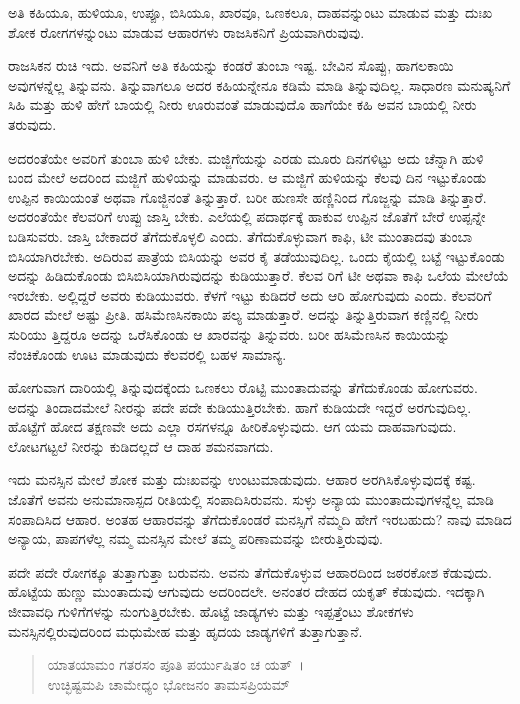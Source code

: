 {\small ಅತಿ ಕಹಿಯೂ, ಹುಳಿಯೂ, ಉಪ್ಪೂ, ಬಿಸಿಯೂ, ಖಾರವೂ, ಒಣಕಲೂ, ದಾಹವನ್ನುಂಟು ಮಾಡುವ ಮತ್ತು ದುಃಖ ಶೋಕ ರೋಗಗಳನ್ನುಂಟು ಮಾಡುವ ಆಹಾರಗಳು ರಾಜಸಿಕನಿಗೆ ಪ್ರಿಯವಾಗಿರುವುವು.}

ರಾಜಸಿಕನ ರುಚಿ ಇದು. ಅವನಿಗೆ ಅತಿ ಕಹಿಯನ್ನು ಕಂಡರೆ ತುಂಬಾ ಇಷ್ಟ. ಬೇವಿನ ಸೊಪ್ಪು, ಹಾಗಲಕಾಯಿ ಅವುಗಳನ್ನೆಲ್ಲ ತಿನ್ನುವನು. ತಿನ್ನುವಾಗಲೂ ಅದರ ಕಹಿಯನ್ನೇನೂ ಕಡಿಮೆ ಮಾಡಿ ತಿನ್ನುವುದಿಲ್ಲ. ಸಾಧಾರಣ ಮನುಷ್ಯನಿಗೆ ಸಿಹಿ ಮತ್ತು ಹುಳಿ ಹೇಗೆ ಬಾಯಲ್ಲಿ ನೀರು ಊರುವಂತೆ ಮಾಡುವುದೊ ಹಾಗೆಯೇ ಕಹಿ ಅವನ ಬಾಯಲ್ಲಿ ನೀರು ತರುವುದು.

ಅದರಂತೆಯೇ ಅವರಿಗೆ ತುಂಬಾ ಹುಳಿ ಬೇಕು. ಮಜ್ಜಿಗೆಯನ್ನು ಎರಡು ಮೂರು ದಿನಗಳಿಟ್ಟು ಅದು ಚೆನ್ನಾಗಿ ಹುಳಿ ಬಂದ ಮೇಲೆ ಅದರಿಂದ ಮಜ್ಜಿಗೆ ಹುಳಿಯನ್ನು ಮಾಡುವರು. ಆ ಮಜ್ಜಿಗೆ ಹುಳಿಯನ್ನು ಕೆಲವು ದಿನ ಇಟ್ಟುಕೊಂಡು ಉಪ್ಪಿನ ಕಾಯಿಯಂತೆ ಅಥವಾ ಗೊಜ್ಜಿನಂತೆ ತಿನ್ನುತ್ತಾರೆ. ಬರೀ ಹುಣಸೇ ಹಣ್ಣಿನಿಂದ ಗೊಜ್ಜನ್ನು ಮಾಡಿ ತಿನ್ನುತ್ತಾರೆ. ಅದರಂತೆಯೇ ಕೆಲವರಿಗೆ ಉಪ್ಪು ಜಾಸ್ತಿ ಬೇಕು. ಎಲೆಯಲ್ಲಿ ಪದಾರ್ಥಕ್ಕೆ ಹಾಕುವ ಉಪ್ಪಿನ ಜೊತೆಗೆ ಬೇರೆ ಉಪ್ಪನ್ನೇ ಬಡಿಸುವರು. ಜಾಸ್ತಿ ಬೇಕಾದರೆ ತೆಗೆದುಕೊಳ್ಳಲಿ ಎಂದು. ತೆಗೆದುಕೊಳ್ಳುವಾಗ ಕಾಫಿ, ಟೀ ಮುಂತಾದವು ತುಂಬಾ ಬಿಸಿಯಾಗಿರಬೇಕು. ಅದಿರುವ ಪಾತ್ರೆಯ ಬಿಸಿಯನ್ನು ಅವರ ಕೈ ತಡೆಯುವುದಿಲ್ಲ. ಒಂದು ಕೈಯಲ್ಲಿ ಬಟ್ಟೆ ಇಟ್ಟುಕೊಂಡು ಅದನ್ನು ಹಿಡಿದುಕೊಂಡು ಬಿಸಿಬಿಸಿಯಾಗಿರುವುದನ್ನು ಕುಡಿಯುತ್ತಾರೆ. ಕೆಲವ ರಿಗೆ ಟೀ ಅಥವಾ ಕಾಫಿ ಒಲೆಯ ಮೇಲೆಯೆ ಇರಬೇಕು. ಅಲ್ಲಿದ್ದರೆ ಅವರು ಕುಡಿಯುವರು. ಕೆಳಗೆ ಇಟ್ಟು ಕುಡಿದರೆ ಅದು ಆರಿ ಹೋಗುವುದು ಎಂದು. ಕೆಲವರಿಗೆ ಖಾರದ ಮೇಲೆ ಅಷ್ಟು ಪ್ರೀತಿ. ಹಸಿಮೆಣಸಿನಕಾಯಿ ಪಲ್ಯ ಮಾಡುತ್ತಾರೆ. ಅದನ್ನು ತಿನ್ನುತ್ತಿರುವಾಗ ಕಣ್ಣಿನಲ್ಲಿ ನೀರು ಸುರಿಯು ತ್ತಿದ್ದರೂ ಅದನ್ನು ಒರೆಸಿಕೊಂಡು ಆ ಖಾರವನ್ನು ತಿನ್ನುವರು. ಬರೀ ಹಸಿಮೆಣಸಿನ ಕಾಯಿಯನ್ನು ನೆಂಚಿಕೊಂಡು ಊಟ ಮಾಡುವುದು ಕೆಲವರಲ್ಲಿ ಬಹಳ ಸಾಮಾನ್ಯ.

ಹೋಗುವಾಗ ದಾರಿಯಲ್ಲಿ ತಿನ್ನುವುದಕ್ಕೆಂದು ಒಣಕಲು ರೊಟ್ಟಿ ಮುಂತಾದುವನ್ನು ತೆಗೆದುಕೊಂಡು ಹೋಗುವರು. ಅದನ್ನು ತಿಂದಾದಮೇಲೆ ನೀರನ್ನು ಪದೇ ಪದೇ ಕುಡಿಯುತ್ತಿರಬೇಕು. ಹಾಗೆ ಕುಡಿಯದೇ ಇದ್ದರೆ ಅರಗುವುದಿಲ್ಲ. ಹೊಟ್ಟೆಗೆ ಹೋದ ತಕ್ಷಣವೇ ಅದು ಎಲ್ಲಾ ರಸಗಳನ್ನೂ ಹೀರಿಕೊಳ್ಳುವುದು. ಆಗ ಯಮ ದಾಹವಾಗುವುದು. ಲೋಟಗಟ್ಟಲೆ ನೀರನ್ನು ಕುಡಿದಲ್ಲದೆ ಆ ದಾಹ ಶಮನವಾಗದು.

ಇದು ಮನಸ್ಸಿನ ಮೇಲೆ ಶೋಕ ಮತ್ತು ದುಃಖವನ್ನು ಉಂಟುಮಾಡುವುದು. ಆಹಾರ ಅರಗಿಸಿಕೊಳ್ಳುವುದಕ್ಕೆ ಕಷ್ಟ. ಜೊತೆಗೆ ಅವನು ಅನುಮಾನಾಸ್ಪದ ರೀತಿಯಲ್ಲಿ ಸಂಪಾದಿಸಿರುವನು. ಸುಳ್ಳು ಅನ್ಯಾಯ ಮುಂತಾದುವುಗಳನ್ನೆಲ್ಲ ಮಾಡಿ ಸಂಪಾದಿಸಿದ ಆಹಾರ. ಅಂತಹ ಆಹಾರವನ್ನು ತೆಗೆದುಕೊಂಡರೆ ಮನಸ್ಸಿಗೆ ನೆಮ್ಮದಿ ಹೇಗೆ ಇರಬಹುದು? ನಾವು ಮಾಡಿದ ಅನ್ಯಾಯ, ಪಾಪಗಳೆಲ್ಲ ನಮ್ಮ ಮನಸ್ಸಿನ ಮೇಲೆ ತಮ್ಮ ಪರಿಣಾಮವನ್ನು ಬೀರುತ್ತಿರುವುವು.

ಪದೇ ಪದೇ ರೋಗಕ್ಕೂ ತುತ್ತಾಗುತ್ತಾ ಬರುವನು. ಅವನು ತೆಗೆದುಕೊಳ್ಳುವ ಆಹಾರದಿಂದ ಜಠರಕೋಶ ಕೆಡುವುದು. ಹೊಟ್ಟೆಯ ಹುಣ್ಣು ಮುಂತಾದುವು ಆಗುವುದು ಅದರಿಂದಲೇ. ಅನಂತರ ದೇಹದ ಯಕೃತ್  ಕೆಡುವುದು. ಇದಕ್ಕಾಗಿ ಜೀವಾವಧಿ ಗುಳಿಗೆಗಳನ್ನು ನುಂಗುತ್ತಿರಬೇಕು. ಹೊಟ್ಟೆ ಜಾಡ್ಯಗಳು ಮತ್ತು ಇಪ್ಪತ್ತೆಂಟು ಶೋಕಗಳು ಮನಸ್ಸಿನಲ್ಲಿರುವುದರಿಂದ ಮಧುಮೇಹ  ಮತ್ತು ಹೃದಯ ಜಾಡ್ಯಗಳಿಗೆ ತುತ್ತಾಗುತ್ತಾನೆ.

\begin{verse}
ಯಾತಯಾಮಂ ಗತರಸಂ ಪೂತಿ ಪರ್ಯುಷಿತಂ ಚ ಯತ್~।\\ಉಚ್ಛಿಷ್ಟಮಪಿ ಚಾಮೇಧ್ಯಂ ಭೋಜನಂ ತಾಮಸಪ್ರಿಯಮ್ 
\end{verse}


